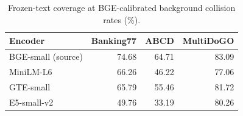 \begin{table}[t]
\centering
\caption{Frozen-text coverage at BGE-calibrated background collision rates (\%).}
\label{tab:cross-encoder-calibrated}
\begin{tabular}{lrrr}
\toprule
Encoder & Banking77 & ABCD & MultiDoGO \\
\midrule
BGE-small (source) & 74.68 & 64.71 & 83.09 \\
MiniLM-L6 & 66.26 & 46.22 & 77.06 \\
GTE-small & 65.79 & 55.46 & 81.72 \\
E5-small-v2 & 49.76 & 33.19 & 80.26 \\
\bottomrule
\end{tabular}
\end{table}

